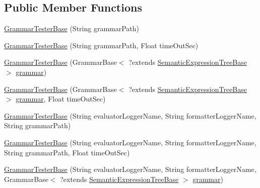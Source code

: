 \subsection*{Public Member Functions}
\begin{DoxyCompactItemize}
\item 
\hyperlink{classit_1_1emarolab_1_1cagg_1_1core_1_1evaluation_1_1interfacing_1_1GrammarTesterBase_a747cf96006db5b0faf3d407f083409b2}{Grammar\-Tester\-Base} (String grammar\-Path)
\item 
\hyperlink{classit_1_1emarolab_1_1cagg_1_1core_1_1evaluation_1_1interfacing_1_1GrammarTesterBase_aaecccfb76baf836e79d59703d4320bf5}{Grammar\-Tester\-Base} (String grammar\-Path, Float time\-Out\-Sec)
\item 
\hyperlink{classit_1_1emarolab_1_1cagg_1_1core_1_1evaluation_1_1interfacing_1_1GrammarTesterBase_a5a110244d2c07f8437164e750f7e5835}{Grammar\-Tester\-Base} (Grammar\-Base$<$ ?extends \hyperlink{interfaceit_1_1emarolab_1_1cagg_1_1core_1_1evaluation_1_1semanticGrammar_1_1syntaxCompiler_1_1SemanticExpressionTreeBase}{Semantic\-Expression\-Tree\-Base} $>$ \hyperlink{classit_1_1emarolab_1_1cagg_1_1core_1_1evaluation_1_1interfacing_1_1GrammarTesterBase_ac6601808f37ef4327e6308143f01dc6a}{grammar})
\item 
\hyperlink{classit_1_1emarolab_1_1cagg_1_1core_1_1evaluation_1_1interfacing_1_1GrammarTesterBase_a23c5b4408e10ebda75eb4a50891c98c6}{Grammar\-Tester\-Base} (Grammar\-Base$<$ ?extends \hyperlink{interfaceit_1_1emarolab_1_1cagg_1_1core_1_1evaluation_1_1semanticGrammar_1_1syntaxCompiler_1_1SemanticExpressionTreeBase}{Semantic\-Expression\-Tree\-Base} $>$ \hyperlink{classit_1_1emarolab_1_1cagg_1_1core_1_1evaluation_1_1interfacing_1_1GrammarTesterBase_ac6601808f37ef4327e6308143f01dc6a}{grammar}, Float time\-Out\-Sec)
\item 
\hyperlink{classit_1_1emarolab_1_1cagg_1_1core_1_1evaluation_1_1interfacing_1_1GrammarTesterBase_a1ddd450b2d803cdf8293d403908d8c44}{Grammar\-Tester\-Base} (String evaluator\-Logger\-Name, String formatter\-Logger\-Name, String grammar\-Path)
\item 
\hyperlink{classit_1_1emarolab_1_1cagg_1_1core_1_1evaluation_1_1interfacing_1_1GrammarTesterBase_a324b37b49ceee9bb014ecee601351408}{Grammar\-Tester\-Base} (String evaluator\-Logger\-Name, String formatter\-Logger\-Name, String grammar\-Path, Float time\-Out\-Sec)
\item 
\hyperlink{classit_1_1emarolab_1_1cagg_1_1core_1_1evaluation_1_1interfacing_1_1GrammarTesterBase_a485c3db2f7a47662fbbaa79d1a753bb8}{Grammar\-Tester\-Base} (String evaluator\-Logger\-Name, String formatter\-Logger\-Name, Grammar\-Base$<$ ?extends \hyperlink{interfaceit_1_1emarolab_1_1cagg_1_1core_1_1evaluation_1_1semanticGrammar_1_1syntaxCompiler_1_1SemanticExpressionTreeBase}{Semantic\-Expression\-Tree\-Base} $>$ \hyperlink{classit_1_1emarolab_1_1cagg_1_1core_1_1evaluation_1_1interfacing_1_1GrammarTesterBase_ac6601808f37ef4327e6308143f01dc6a}{grammar})

\end{DoxyCompactItemize}
